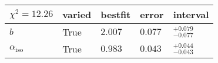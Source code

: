 \begin{tabular}{lllll}
\hline
 $\chi^{2} = 12.26$      & varied   & bestfit   & error   & interval               \\
\hline
 $b$                     & True     & $2.007$   & $0.077$ & ${}_{-0.077}^{+0.079}$ \\
 $\alpha_{\mathrm{iso}}$ & True     & $0.983$   & $0.043$ & ${}_{-0.043}^{+0.044}$ \\
\hline
\end{tabular}